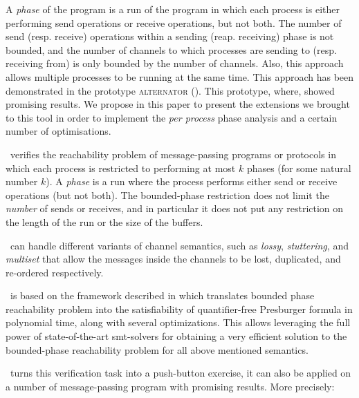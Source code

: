 A \textit{phase} of the program is a run of the program in which each process 
is either performing send operations or receive operations, but not both.
%
The number of send (resp. receive) operations within a sending (reap. receiving) phase
is not bounded, and the number of channels to which processes are sending to (resp. receiving from)
is only bounded by the number of channels.
%
Also, this approach allows multiple processes to be running at the same time.
This approach has been demonstrated in the prototype \textsc{alternator} (\cite{github.alternator}).
%
This prototype, where, showed promising results.
%
We propose in this paper to present the extensions we brought to this tool in order
to implement the \textit{per process} phase analysis and a certain number of optimisations.

%
\MPass\ verifies the reachability problem of message-passing programs or protocols in which each process is restricted to performing at most $k$ phases (for some natural number $k$).
A {\it phase}  is a run where the process performs  either send or receive operations
(but not both). The bounded-phase  restriction does not limit the \emph{number} of
sends or receives,  and in particular it does not put any restriction on the length of the
run or the size of the buffers.

%
%

\MPass\ can handle different variants of channel semantics, such as
{\it lossy}, {\it stuttering}, and {\it multiset} that
allow the messages inside the channels to be lost,
duplicated, and re-ordered respectively.



%
\MPass\ is based on the framework   described in \cite{AAC13} which translates bounded phase reachability problem  into the satisfiability of quantifier-free Presburger formula in polynomial time, along with several optimizations. This allows  leveraging the full power of state-of-the-art
{\sc smt}-solvers for obtaining a very efficient solution to the bounded-phase reachability problem for all above mentioned semantics. 


\MPass\ turns this verification task into a push-button exercise,   it can also  be  applied on a number of message-passing program with promising results. More precisely:

